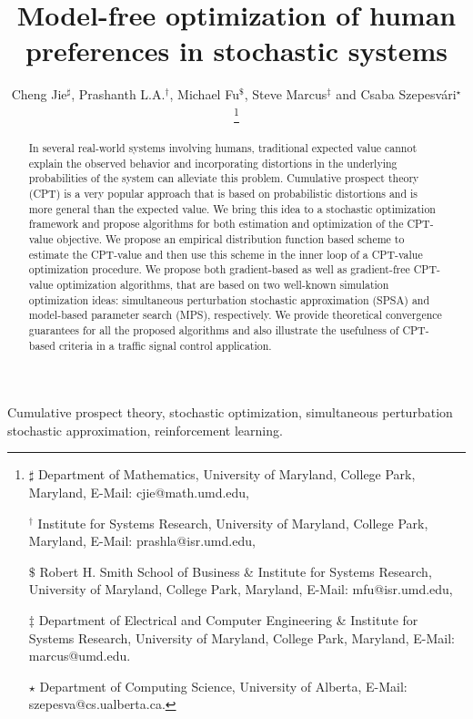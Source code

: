 \documentclass[twocolumn]{IEEEtran}
\begin{document}
\title{Model-free optimization of human preferences in stochastic systems}
\author{Cheng Jie$^\sharp$, Prashanth L.A.$^\dagger$, Michael Fu$^\$$, Steve Marcus$^\ddag$ and Csaba Szepesv\'ari$^\star$
\thanks{
$\sharp$ Department of Mathematics,
University of Maryland, College Park, Maryland, 
E-Mail: cjie@math.umd.edu, 

$^\dagger$ Institute for Systems Research, University of Maryland, College Park, Maryland,
E-Mail: prashla@isr.umd.edu,

$\$$ Robert H. Smith School of Business \& Institute for Systems Research,
University of Maryland, College Park, Maryland,
E-Mail: mfu@isr.umd.edu,

$\ddag$ Department of Electrical and Computer Engineering \& Institute for Systems Research,
University of Maryland, College Park, Maryland,
 E-Mail: marcus@umd.edu.

$\star$ Department of Computing Science,
University of Alberta,
 E-Mail: szepesva@cs.ualberta.ca.
}}
\maketitle


\begin{abstract}
In several real-world systems involving humans, traditional expected value cannot explain the observed behavior and incorporating distortions in the underlying probabilities of the system can alleviate this problem. Cumulative prospect theory (CPT) is a very popular approach that is based on probabilistic distortions and is more general than the expected value.  We bring this idea to a stochastic optimization framework and propose algorithms for both estimation and optimization of the CPT-value objective. We propose an empirical distribution function based scheme to estimate the CPT-value and then use this scheme in the inner loop of a CPT-value optimization procedure. We propose both gradient-based as well as gradient-free CPT-value optimization algorithms, that are based on two well-known simulation optimization ideas: simultaneous perturbation stochastic approximation (SPSA) and model-based parameter search (MPS), respectively.  We provide theoretical convergence guarantees for all the proposed algorithms and also illustrate the usefulness of CPT-based criteria in a traffic signal control application.
\end{abstract}

\begin{IEEEkeywords}
Cumulative prospect theory, stochastic optimization, simultaneous perturbation stochastic approximation, reinforcement learning.
\end{IEEEkeywords}
\end{document}
